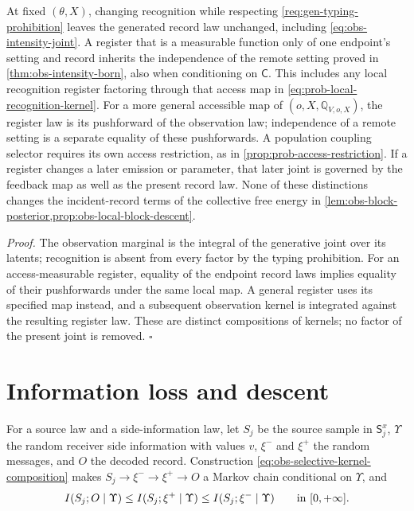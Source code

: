 At fixed $(\theta,X)$, changing recognition while respecting
\cref{req:gen-typing-prohibition} leaves the generated record law unchanged,
including \eqref{eq:obs-intensity-joint}. A register that is a measurable
function only of one endpoint's setting and record inherits the independence
of the remote setting proved in \cref{thm:obs-intensity-born}, also when
conditioning on $\mathsf C$. This includes any local recognition register
factoring through that access map in
\eqref{eq:prob-local-recognition-kernel}. For a more general accessible map
of $(o,X,\mathbb Q_{V,o,X})$, the register law is its pushforward of the
observation law; independence of a remote setting is a separate equality of
these pushforwards. A population coupling selector requires its own access
restriction, as in \cref{prop:prob-access-restriction}. If a register changes
a later emission or parameter, that later joint is governed by the feedback
map as well as the present record law. None of these distinctions changes
the incident-record terms of the collective free energy in
\cref{lem:obs-block-posterior,prop:obs-local-block-descent}.

\noindent\emph{Proof.}
The observation marginal is the integral of the generative joint over its
latents; recognition is absent from every factor by the typing prohibition.
For an access-measurable register, equality of the endpoint record laws
implies equality of their pushforwards under the same local map. A general
register uses its specified map instead, and a subsequent observation kernel
is integrated against the resulting register law. These are distinct
compositions of kernels; no factor of the present joint is removed.
$\square$

\section{Information loss and descent}
\label{sec:selective-information}

For a source law and a side-information law, let \(S_j\) be the source sample
in \(\mathsf S_j^x\), \(\Upsilon\) the random receiver side information with
values \(v\), \(\xi^-\) and \(\xi^+\) the random messages, and \(O\) the decoded
record. Construction \eqref{eq:obs-selective-kernel-composition} makes
\(S_j\to\xi^-\to\xi^+\to O\) a Markov chain conditional on \(\Upsilon\), and
\begin{equation}
I(S_j;O\mid\Upsilon)\leq I(S_j;\xi^+\mid\Upsilon)\leq I(S_j;\xi^-\mid\Upsilon)
\qquad\text{in }[0,+\infty].
\label{eq:obs-selective-information-chain}
\end{equation}

